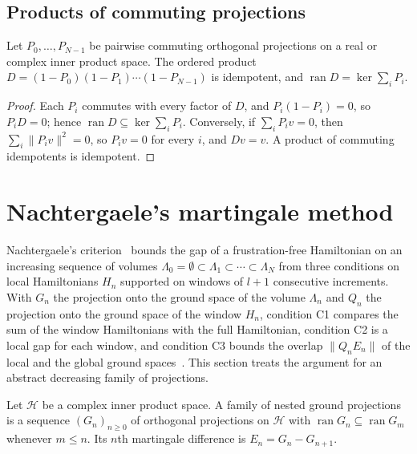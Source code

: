 \subsection{Products of commuting projections}
\label{sec:martingale_gaps_products}

\begin{lemma}
    \label{lem:gap_commuting_projection_product}
    \leanok
    Let $P_0,\dots,P_{N-1}$ be pairwise commuting orthogonal projections on a real or
    complex inner product space. The ordered product
    $D=(1-P_0)(1-P_1)\cdots(1-P_{N-1})$ is idempotent, and
    $\operatorname{ran}D=\ker\sum_iP_i$.
\end{lemma}
\begin{proof}\leanok
    Each $P_i$ commutes with every factor of $D$, and $P_i(1-P_i)=0$, so $P_iD=0$;
    hence $\operatorname{ran}D\subseteq\ker\sum_iP_i$. Conversely, if $\sum_iP_iv=0$,
    then $\sum_i\lVert P_iv\rVert^2=0$, so $P_iv=0$ for every $i$, and $Dv=v$. A
    product of commuting idempotents is idempotent.
\end{proof}

\section{Nachtergaele's martingale method}
\label{sec:martingale_nachtergaele}

Nachtergaele's criterion~\cite[Theorem~2.1(i)]{Nachtergaele1996Spectral} bounds the
gap of a frustration-free Hamiltonian on an increasing sequence of volumes
$\Lambda_0=\emptyset\subset\Lambda_1\subset\cdots\subset\Lambda_N$ from three conditions on
local Hamiltonians $H_n$ supported on windows of $l+1$ consecutive increments. With
$G_n$ the projection onto the ground space of the volume $\Lambda_n$ and $Q_n$ the
projection onto the ground space of the window $H_n$, condition C1 compares the sum of
the window Hamiltonians with the full Hamiltonian, condition C2 is a local gap for each
window, and condition C3 bounds the overlap $\lVert Q_nE_n\rVert$ of the local and the
global ground spaces~\cite[lines 1030--1094]{Nachtergaele1996Spectral}. This section
treats the argument for an abstract decreasing family of projections.

\begin{definition}
    \label{def:martingale_nested_projections}
    \leanok
    Let $\mathcal H$ be a complex inner product space. A family of nested ground
    projections is a sequence $(G_n)_{n\ge0}$ of orthogonal projections on
    $\mathcal H$ with $\operatorname{ran}G_n\subseteq\operatorname{ran}G_m$ whenever
    $m\le n$. Its $n$th martingale difference is $E_n=G_n-G_{n+1}$.
\end{definition}

